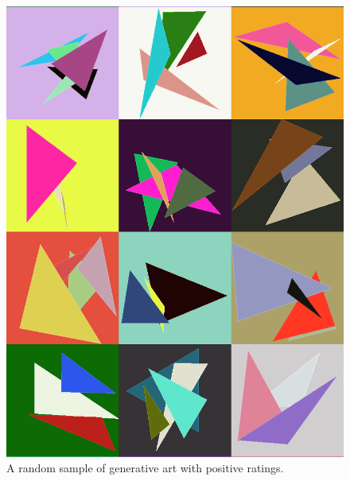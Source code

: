 \documentclass[midd]{thesis}
\begin{document}
\begin{figure}[tp]
\centering
\includegraphics[width=\textwidth]{visualizations/prettygallery-shortened.png}
\caption{A random sample of generative art with positive ratings.}
\label{fig:positive-geneartive-art}
\end{figure}
\end{document}
